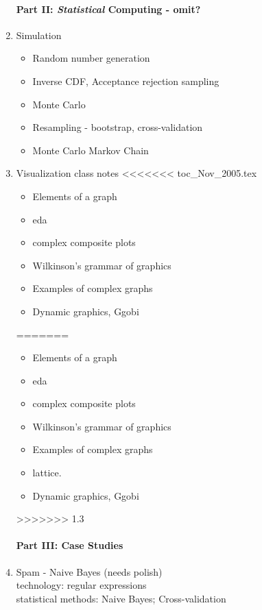 \documentclass[11pt,timesroman]{article}
\begin{document}
\begin{enumerate}
\paragraph{Part II: \textit{Statistical} Computing - omit?}

\item{Simulation}
        \begin{itemize}
        \item Random number generation
        \item Inverse CDF, Acceptance rejection sampling
        \item Monte Carlo
        \item Resampling - bootstrap, cross-validation
        \item Monte Carlo Markov Chain
        \end{itemize}


\item{Visualization class notes}
<<<<<<< toc_Nov_2005.tex
        \begin{itemize}
        \item Elements of a graph
        \item eda
        \item complex composite plots
        \item Wilkinson's grammar of graphics
        \item Examples of complex graphs
        \item Dynamic graphics, Ggobi
        \end{itemize}
=======
        \begin{itemize}
        \item Elements of a graph
        \item eda
        \item complex composite plots
        \item Wilkinson's grammar of graphics
        \item Examples of complex graphs
        \item lattice.
        \item Dynamic graphics, Ggobi
        \end{itemize}
>>>>>>> 1.3


\paragraph{Part III: Case Studies}


\item{Spam - Naive Bayes (needs polish)}
\\
technology: regular expressions
\\
statistical methods: Naive Bayes; Cross-validation


\end{enumerate}
\end{document}
